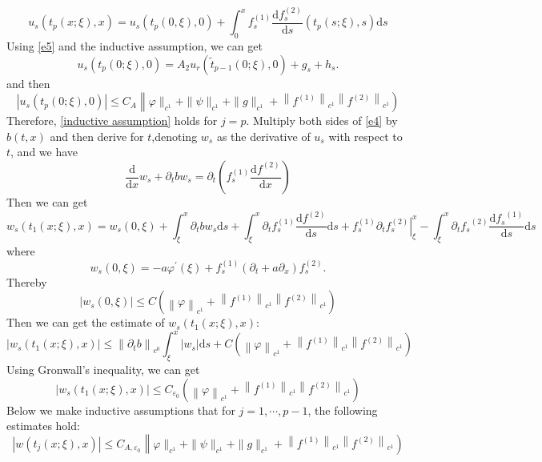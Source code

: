 \documentclass[a4paper,reqno,11pt]{amsart}
\numberwithin{equation}{section} %
\begin{document}
$$
u_s\left( t_p\left( x;\xi \right) ,x \right) =u_s(t_p(0,\xi ),0)+\int_{0}^x{f_{s}^{(1)}\frac{\mathrm{d}f_{s}^{(2)}}{\mathrm{d}s}\left( t_p\left( s;\xi \right) ,s \right) \mathrm{d}s}
$$
Using \eqref{e5} and the inductive assumption, we can get
$$
u_s\left(t_p(0 ; \xi), 0\right)=A_2 u_r\left(\tilde{t}_{p-1}(0 ; \xi), 0\right)+g_s+h_s .
$$
and then
$$
\left| u_s\left( t_p(0;\xi ),0 \right) \right|\leqslant C_A\left\| \varphi \parallel _{c^1}+\parallel \psi \parallel _{c^1}+\parallel g\parallel _{c^1}+\left\| f^{(1)} \right\| _{c^1}\left\| f^{(2)} \right\| _{c^1} \right) 
$$
Therefore, \eqref{inductive assumption} holds for $j=p$.
Multiply both sides of \eqref{e4} by $b(t,x)$ and then derive for $t$,denoting $w_s$ as the derivative of $u_s$ with respect to $t$, and we have
$$
\frac{\mathrm{d}}{\mathrm{d}x}w_s+\partial _tbw_s=\partial _t\left( f_{s}^{(1)}\frac{\mathrm{d}f^{(2)}}{\mathrm{d}x} \right) 
$$
Then we can get
\begin{equation}\label{e of w_s 1}
w_s\left( t_1(x;\xi ),x \right) =w_s(0,\xi )+\int_{\xi}^x{\partial _tbw_s\mathrm{d}s}+\int_{\xi}^x{\partial _tf_{s}^{(1)}\frac{\mathrm{d}f^{(2)}}{\mathrm{d}s}\mathrm{d}s}+\left. f_{s}^{(1)}\partial _tf_{s}^{(2)} \right|_{\xi}^{x}-\int_{\xi}^x{\partial _t{f_s}^{(2)}\frac{\mathrm{d}{f_s}^{(1)}}{\mathrm{d}s}\mathrm{d}s}
\end{equation}
where
\begin{equation}\label{w_s at 0}
w_s(0, \xi)=-a \varphi^{\prime}(\xi)+f_s^{(1)}\left(\partial_t+a \partial_x\right) f_s^{(2)} .
\end{equation}
Thereby
$$
\left| w_s(0,\xi ) \right|\leqslant C\left( \left\| \varphi \right\| _{c^1}+\left\| f^{\left( 1 \right)} \right\| _{c^1}\left\| f^{(2)} \right\| _{c^1} \right) 
$$
Then we can get the estimate of $w_s\left( t_1(x;\xi ),x \right) $:
$$
\left| w_s\left( t_1(x;\xi ),x \right) \right|\leqslant \left\| \partial _tb \right\| _{c^0}\int_{\xi}^x{\left| w_s \right|\mathrm{d}s}+C\left( \left\| \varphi \right\| _{c^1}+\left\| f^{(1)} \right\| _{c^1}\left\| f^{(2)} \right\| _{c^1} \right) 
$$
Using Gronwall's inequality, we can get
$$
\left| w_s\left( t_1(x;\xi ),x \right) \right|\leqslant C_{\varepsilon _0}\left( \left\| \varphi \right\| _{c^1}+\left\| f^{(1)} \right\| _{c^1}\left\| f^{(2)} \right\| _{c^1} \right) 
$$
Below we make inductive assumptions that for $j=1,\cdots,p-1$, the following estimates hold:
\begin{equation}\label{inductive assumption for w}
\left| w\left( t_j(x;\xi ),x \right) \right|\leqslant C_{A,\varepsilon _0}\left\| \varphi \parallel _{c^1}+\parallel \psi \parallel _{c^1}+\parallel g\parallel _{c^1}+\left\| f^{(1)} \right\| _{c^1}\left\| f^{(2)} \right\| _{c^1} \right)
\end{equation}
\end{document}
